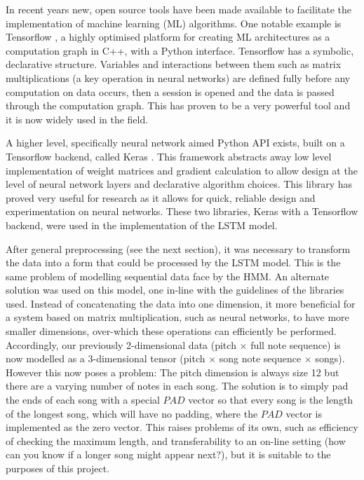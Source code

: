 \documentclass[bsc,singlespacing,logo, parskip, deptreport]{infthesis}
\begin{document}
In recent years new, open source tools have been made available to facilitate the implementation of machine learning (ML) algorithms. One notable example is Tensorflow \cite{tensorflow2015-whitepaper}, a highly optimised platform for creating ML architectures as a computation graph in C++, with a Python interface. Tensorflow has a symbolic, declarative structure. Variables and interactions between them such as matrix multiplications (a key operation in neural networks) are defined fully before any computation on data occurs, then a session is opened and the data is passed through the computation graph. This has proven to be a very powerful tool and it is now widely used in the field.

A higher level, specifically neural network aimed Python API exists, built on a Tensorflow backend, called Keras \cite{chollet2015}. This framework abstracts away low level implementation of weight matrices and gradient calculation to allow design at the level of neural network layers and declarative algorithm choices. This library has proved very useful for research as it allows for quick, reliable design and experimentation on neural networks. These two libraries, Keras with a Tensorflow backend, were used in the implementation of the LSTM model.

After general preprocessing (see the next section), it was necessary to transform the data into a form that could be processed by the LSTM model. This is the same problem of modelling sequential data face by the HMM. An alternate solution was used on this model, one in-line with the guidelines of the libraries used. Instead of concatenating the data into one dimension, it more beneficial for a system based on matrix multiplication, such as neural networks, to have more smaller dimensions, over-which these operations can efficiently be performed. Accordingly, our previously 2-dimensional data (pitch $\times$ full note sequence) is now modelled as a 3-dimensional tensor (pitch $\times$ song note sequence $\times$ songs). However this now poses a problem: The pitch dimension is always size 12 but there are a varying number of notes in each song. The solution is to simply pad the ends of each song with a special $PAD$ vector so that every song is the length of the longest song, which will have no padding, where the $PAD$ vector is implemented as the zero vector. This raises problems of its own, such as efficiency of checking the maximum length, and transferability to an on-line setting (how can you know if a longer song might appear next?), but it is suitable to the purposes of this project.
\end{document}
